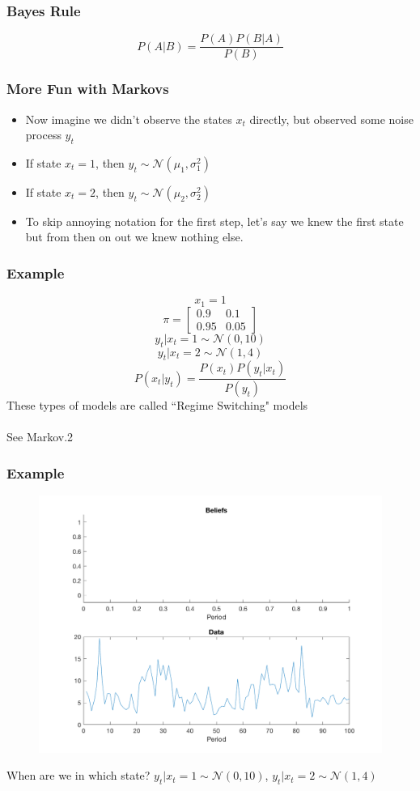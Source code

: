 \documentclass{beamer}
\begin{document}
\begin{frame}
\frametitle[alignment=center]{Bayes Rule}
$$P(A|B)=\frac{P(A)P(B|A)}{P(B)}$$
\end{frame}

\begin{frame}
\frametitle[alignment=center]{More Fun with Markovs}
\begin{itemize}
\item Now imagine we didn't observe the states $x_t$ directly, but observed some noise process $y_t$
\bigskip
\item If state $x_t=1$, then $y_t\sim\mathcal{N}(\mu_1,\sigma_1^2)$
\bigskip
\item If state $x_t=2$, then $y_t\sim\mathcal{N}(\mu_2,\sigma_2^2)$
\bigskip
\item To skip annoying notation for the first step, let's say we knew the first state but from then on out we knew nothing else.
\end{itemize}
\end{frame}

\begin{frame}
\frametitle[alignment=center]{Example}
$$x_1=1$$
$$\pi=\left[\begin{array}{cc}0.9 & 0.1 \\ 0.95 & 0.05\end{array}\right]$$
$$y_t|x_t=1\sim\mathcal{N}(0,10)$$
$$y_t|x_t=2\sim\mathcal{N}(1,4)$$
$$P(x_t|y_t)=\frac{P(x_t)P(y_t|x_t)}{P(y_t)}$$
 These types of models are called ``Regime Switching" models\\
 \ \\
See Markov.2
\end{frame}

\begin{frame}
\frametitle[alignment=center]{Example}
\begin{figure}
\centering
\includegraphics[scale=0.5]{Markov1.png}
\end{figure}
\small
When are we in which state?   $y_t|x_t=1\sim\mathcal{N}(0,10)$, $y_t|x_t=2\sim\mathcal{N}(1,4)$
\end{frame}
\end{document}
